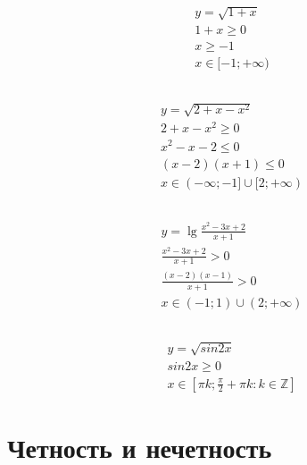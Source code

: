 \documentclass{article}
\begin{document}
\subsection{}

\begin{gather*}
	y = \sqrt{1 + x} \\
	1 + x \ge 0 \\
	x \ge -1 \\
	x \in [-1; +\infty)
\end{gather*}

\subsection{}

\begin{gather*}
	y = \sqrt{2 + x - x^2} \\
	2 + x - x^2 \ge 0 \\
	x^2 - x - 2 \le 0 \\
	(x - 2)(x + 1) \le 0 \\
	x \in (-\infty; -1] \cup [2; +\infty)	
\end{gather*}

\subsection{}

\begin{gather*}
	y = \lg{\frac{x^2 - 3x + 2}{x + 1}} \\
	\frac{x^2 - 3x + 2}{x + 1} > 0 \\
	\frac{(x - 2)(x - 1)}{x + 1} > 0 \\
	x \in (-1; 1) \cup (2; +\infty)
\end{gather*}

\subsection{}

\begin{gather*}
	y = \sqrt{sin 2x} \\
	sin 2x \ge 0 \\
	x \in [\pi k; \frac{\pi}{2} + \pi k: k \in \mathbb{Z}]
\end{gather*}

\section{Четность и нечетность}
\end{document}

